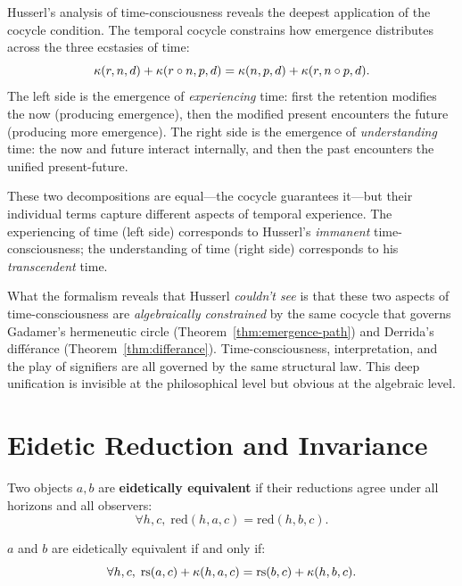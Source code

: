 \begin{interpretation}
Husserl's analysis of time-consciousness reveals the deepest application of
the cocycle condition. The temporal cocycle constrains how emergence
distributes across the three ecstasies of time:
\[
\kappa(r, n, d) + \kappa(r \circ n, p, d)
= \kappa(n, p, d) + \kappa(r, n \circ p, d).
\]
The left side is the emergence of \emph{experiencing} time: first the
retention modifies the now (producing emergence), then the modified present
encounters the future (producing more emergence). The right side is the
emergence of \emph{understanding} time: the now and future interact internally,
and then the past encounters the unified present-future.

These two decompositions are equal---the cocycle guarantees it---but their
individual terms capture different aspects of temporal experience. The
experiencing of time (left side) corresponds to Husserl's \emph{immanent}
time-consciousness; the understanding of time (right side) corresponds to
his \emph{transcendent} time.

What the formalism reveals that Husserl \emph{couldn't see} is that these
two aspects of time-consciousness are \emph{algebraically constrained} by
the same cocycle that governs Gadamer's hermeneutic circle
(Theorem~\ref{thm:emergence-path}) and Derrida's diff\'erance
(Theorem~\ref{thm:differance}). Time-consciousness, interpretation, and
the play of signifiers are all governed by the same structural law. This
deep unification is invisible at the philosophical level but obvious at
the algebraic level.
\end{interpretation}


\section{Eidetic Reduction and Invariance}

\begin{definition}
\label{def:eidetic-equiv}
Two objects $a, b$ are \textbf{eidetically equivalent} if their reductions
agree under all horizons and all observers:
\[
\forall h, c,\; \mathrm{red}(h, a, c) = \mathrm{red}(h, b, c).
\]
\end{definition}

\begin{theorem}
\label{thm:eidetic-iff}
$a$ and $b$ are eidetically equivalent if and only if:
\[
\forall h, c,\; \mathrm{rs}(a, c) + \kappa(h, a, c) = \mathrm{rs}(b, c) + \kappa(h, b, c).
\]
\end{theorem}

